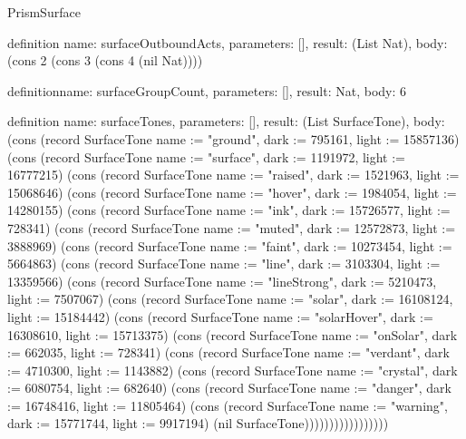 \begin{lexlean}{PrismSurface}
\begin{semanticmodule}
definition{
  name: surfaceOutboundActs,
  parameters: [],
  result: (List Nat),
  body: (cons 2 (cons 3 (cons 4 (nil Nat))))
}

definition{name: surfaceGroupCount, parameters: [], result: Nat, body: 6}

definition{
  name: surfaceTones,
  parameters: [],
  result: (List SurfaceTone),
  body: (cons (record SurfaceTone {name := "ground", dark := 795161, light := 15857136}) (cons (record SurfaceTone {name := "surface", dark := 1191972, light := 16777215}) (cons (record SurfaceTone {name := "raised", dark := 1521963, light := 15068646}) (cons (record SurfaceTone {name := "hover", dark := 1984054, light := 14280155}) (cons (record SurfaceTone {name := "ink", dark := 15726577, light := 728341}) (cons (record SurfaceTone {name := "muted", dark := 12572873, light := 3888969}) (cons (record SurfaceTone {name := "faint", dark := 10273454, light := 5664863}) (cons (record SurfaceTone {name := "line", dark := 3103304, light := 13359566}) (cons (record SurfaceTone {name := "lineStrong", dark := 5210473, light := 7507067}) (cons (record SurfaceTone {name := "solar", dark := 16108124, light := 15184442}) (cons (record SurfaceTone {name := "solarHover", dark := 16308610, light := 15713375}) (cons (record SurfaceTone {name := "onSolar", dark := 662035, light := 728341}) (cons (record SurfaceTone {name := "verdant", dark := 4710300, light := 1143882}) (cons (record SurfaceTone {name := "crystal", dark := 6080754, light := 682640}) (cons (record SurfaceTone {name := "danger", dark := 16748416, light := 11805464}) (cons (record SurfaceTone {name := "warning", dark := 15771744, light := 9917194}) (nil SurfaceTone)))))))))))))))))
}


\end{semanticmodule}
\end{lexlean}
